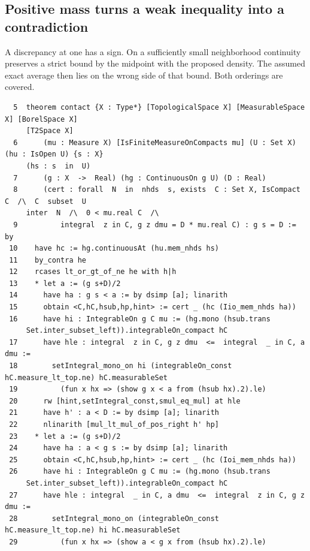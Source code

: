 \documentclass[12pt,letterpaper]{article}
\begin{document}
\clearpage{}\subsection*{Positive mass turns a weak inequality into a contradiction}
A discrepancy at one has a sign. On a sufficiently small neighborhood continuity preserves a strict bound by the midpoint with the proposed density. The assumed exact average then lies on the wrong side of that bound. Both orderings are covered.
\par
{\fontsize{8.8}{10.5}\selectfont\begin{verbatim}
  5  theorem contact {X : Type*} [TopologicalSpace X] [MeasurableSpace X] [BorelSpace X]
     [T2Space X]
  6      (mu : Measure X) [IsFiniteMeasureOnCompacts mu] (U : Set X) (hu : IsOpen U) {s : X}
     (hs : s  in  U)
  7      (g : X  ->  Real) (hg : ContinuousOn g U) (D : Real)
  8      (cert : forall  N  in  nhds  s, exists  C : Set X, IsCompact C  /\  C  subset  U
     inter  N  /\  0 < mu.real C  /\
  9          integral  z in C, g z dmu = D * mu.real C) : g s = D := by
 10    have hc := hg.continuousAt (hu.mem_nhds hs)
 11    by_contra he
 12    rcases lt_or_gt_of_ne he with h|h
 13    * let a := (g s+D)/2
 14      have ha : g s < a := by dsimp [a]; linarith
 15      obtain <C,hC,hsub,hp,hint> := cert _ (hc (Iio_mem_nhds ha))
 16      have hi : IntegrableOn g C mu := (hg.mono (hsub.trans
     Set.inter_subset_left)).integrableOn_compact hC
 17      have hle : integral  z in C, g z dmu  <=  integral  _ in C, a dmu :=
 18        setIntegral_mono_on hi (integrableOn_const hC.measure_lt_top.ne) hC.measurableSet
 19          (fun x hx => (show g x < a from (hsub hx).2).le)
 20      rw [hint,setIntegral_const,smul_eq_mul] at hle
 21      have h' : a < D := by dsimp [a]; linarith
 22      nlinarith [mul_lt_mul_of_pos_right h' hp]
 23    * let a := (g s+D)/2
 24      have ha : a < g s := by dsimp [a]; linarith
 25      obtain <C,hC,hsub,hp,hint> := cert _ (hc (Ioi_mem_nhds ha))
 26      have hi : IntegrableOn g C mu := (hg.mono (hsub.trans
     Set.inter_subset_left)).integrableOn_compact hC
 27      have hle : integral  _ in C, a dmu  <=  integral  z in C, g z dmu :=
 28        setIntegral_mono_on (integrableOn_const hC.measure_lt_top.ne) hi hC.measurableSet
 29          (fun x hx => (show a < g x from (hsub hx).2).le)
\end{verbatim}}
\end{document}
